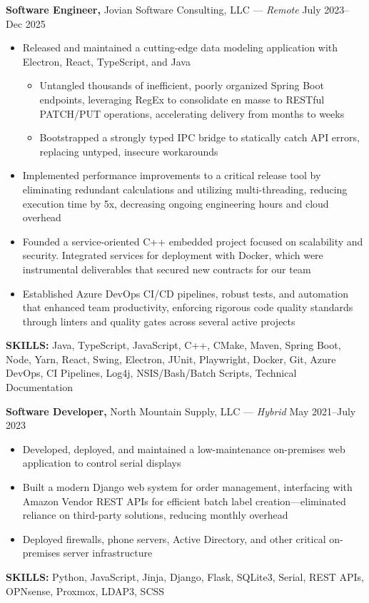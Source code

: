 \documentclass[11pt]{article}       %
\begin{document}
\textbf{Software Engineer,} {Jovian Software Consulting, LLC} --- \textit{Remote} \hfill July 2023--Dec 2025 \\
\vspace{-9pt}
\begin{itemize}[leftmargin=0.35in]
  \item Released and maintained a cutting-edge data modeling application with Electron, React, TypeScript, and Java
  \vspace{-9pt}
  \begin{itemize}
    \item Untangled thousands of inefficient, poorly organized Spring Boot endpoints, leveraging RegEx to consolidate en masse to RESTful PATCH/PUT operations, accelerating delivery from months to weeks
    \item Bootstrapped a strongly typed IPC bridge to statically catch API errors, replacing untyped, insecure workarounds
  \end{itemize}
  \vspace{-9pt}
  \item Implemented performance improvements to a critical release tool by eliminating redundant calculations and utilizing multi-threading, reducing execution time by 5x, decreasing ongoing engineering hours and cloud overhead
  \item Founded a service-oriented C++ embedded project focused on scalability and security. Integrated services for deployment with Docker, which were instrumental deliverables that secured new contracts for our team
  \item Established Azure DevOps CI/CD pipelines, robust tests, and automation that enhanced team productivity, enforcing rigorous code quality standards through linters and quality gates across several active projects
\end{itemize}
\vspace{-9pt}
\textbf{SKILLS:} Java, TypeScript, JavaScript, C++, CMake, Maven, Spring Boot, Node, Yarn, React, Swing, Electron, JUnit, Playwright, Docker, Git, Azure DevOps, CI Pipelines, Log4j, NSIS/Bash/Batch Scripts, Technical Documentation
\vspace{9pt}

\textbf{Software Developer,} {North Mountain Supply, LLC} --- \textit{Hybrid} \hfill May 2021--July 2023 \\
\vspace{-9pt}
\begin{itemize}[leftmargin=0.35in]
  \item Developed, deployed, and maintained a low-maintenance on-premises web application to control serial displays
  \item Built a modern Django web system for order management, interfacing with Amazon Vendor REST APIs for efficient batch label creation---eliminated reliance on third-party solutions, reducing monthly overhead
  \item Deployed firewalls, phone servers, Active Directory, and other critical on-premises server infrastructure
\end{itemize}
\vspace{-9pt}
\textbf{SKILLS:} Python, JavaScript, Jinja, Django, Flask, SQLite3, Serial, REST APIs, OPNsense, Proxmox, LDAP3, SCSS
\end{document}
